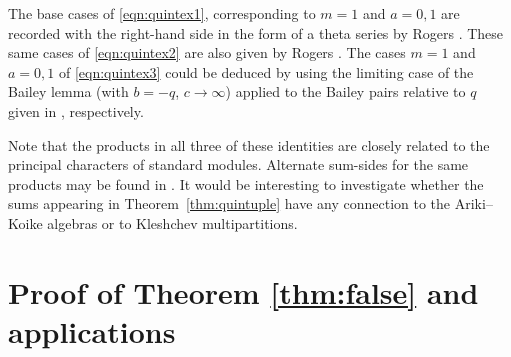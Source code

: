 \documentclass[pdftex]{sigma}
\numberwithin{equation}{section}
\begin{document}
\begin{Remark}
The base cases of \eqref{eqn:quintex1}, corresponding to $m=1$ and $a=0,1$ are recorded with the right-hand side in the form of a theta series by Rogers \cite[p.~331, equation~(1)]{Ro1}. These same cases of \eqref{eqn:quintex2} are also given by Rogers \cite[p.~330, equation~(2)]{Ro1}.
The cases $m=1$ and $a=0,1$ of \eqref{eqn:quintex3} could be deduced by using the limiting case of the Bailey lemma (with $b=-q$, $c\rightarrow\infty$) applied to the Bailey pairs relative to $q$ given in \cite[equations~(3.6) and~(3.11)]{And1}, respectively.
\end{Remark}

\begin{Remark}
Note that the products in all three of these identities are closely related to the principal characters of standard  modules. Alternate sum-sides for the same products may be found in \cite{KR}.
It would be interesting to investigate whether the sums appearing in Theorem~\ref{thm:quintuple} have any connection to the Ariki--Koike algebras or to Kleshchev multipartitions.
\end{Remark}


\section{Proof of Theorem \ref{thm:false} and applications}
\label{sec:falsetheta}
\end{document}
